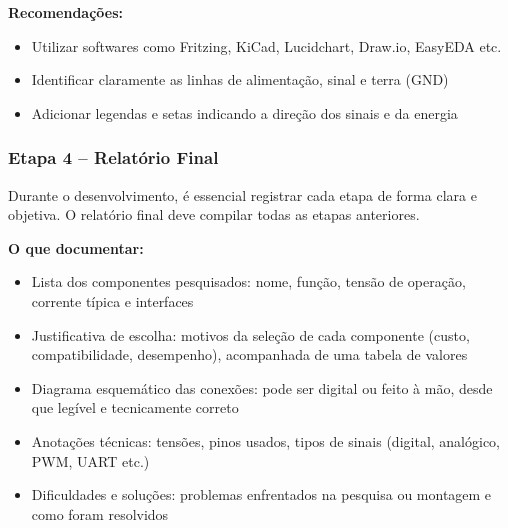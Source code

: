 \textbf{Recomendações:}
\begin{itemize}
    \item Utilizar softwares como Fritzing, KiCad, Lucidchart, Draw.io, EasyEDA etc.
    \item Identificar claramente as linhas de alimentação, sinal e terra (GND)
    \item Adicionar legendas e setas indicando a direção dos sinais e da energia
\end{itemize}

\subsubsection*{Etapa 4 – Relatório Final}

Durante o desenvolvimento, é essencial registrar cada etapa de forma clara e objetiva. O relatório final deve compilar todas as etapas anteriores.

\textbf{O que documentar:}
\begin{itemize}
    \item Lista dos componentes pesquisados: nome, função, tensão de operação, corrente típica e interfaces
    \item Justificativa de escolha: motivos da seleção de cada componente (custo, compatibilidade, desempenho), acompanhada de uma tabela de valores
    \item Diagrama esquemático das conexões: pode ser digital ou feito à mão, desde que legível e tecnicamente correto
    \item Anotações técnicas: tensões, pinos usados, tipos de sinais (digital, analógico, PWM, UART etc.)
    \item Dificuldades e soluções: problemas enfrentados na pesquisa ou montagem e como foram resolvidos
\end{itemize}



